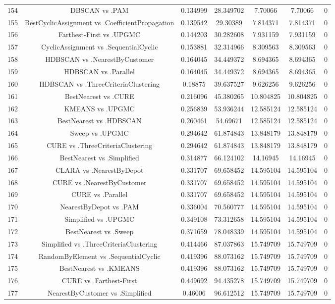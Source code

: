\documentclass[a4paper,10pt]{article}
\begin{document}
\begin{landscape}
\begin{table}[!htp]
\begin{tabular}{ccccccc}
154&DBSCAN vs .PAM&0.134999&28.349702&7.70066&7.70066&0\\
155&BestCyclicAssignment vs .CoefficientPropagation&0.139542&29.30389&7.814371&7.814371&0\\
156&Farthest-First vs .UPGMC&0.144203&30.282608&7.931159&7.931159&0\\
157&CyclicAssignment vs .SequentialCyclic&0.153881&32.314966&8.309563&8.309563&0\\
158&HDBSCAN vs .NearestByCustomer&0.164045&34.449372&8.694365&8.694365&0\\
159&HDBSCAN vs .Parallel&0.164045&34.449372&8.694365&8.694365&0\\
160&HDBSCAN vs .ThreeCriteriaClustering&0.18875&39.637527&9.626256&9.626256&0\\
161&BestNearest vs .CURE&0.216096&45.380265&10.804825&10.804825&0\\
162&KMEANS vs .UPGMC&0.256839&53.936244&12.585124&12.585124&0\\
163&BestNearest vs .HDBSCAN&0.260461&54.69671&12.585124&12.585124&0\\
164&Sweep vs .UPGMC&0.294642&61.874843&13.848179&13.848179&0\\
165&CURE vs .ThreeCriteriaClustering&0.294642&61.874843&13.848179&13.848179&0\\
166&BestNearest vs .Simplified&0.314877&66.124102&14.16945&14.16945&0\\
167&CLARA vs .NearestByDepot&0.331707&69.658452&14.595104&14.595104&0\\
168&CURE vs .NearestByCustomer&0.331707&69.658452&14.595104&14.595104&0\\
169&CURE vs .Parallel&0.331707&69.658452&14.595104&14.595104&0\\
170&NearestByDepot vs .PAM&0.336004&70.560777&14.595104&14.595104&0\\
171&Simplified vs .UPGMC&0.349108&73.312658&14.595104&14.595104&0\\
172&BestNearest vs .Sweep&0.371659&78.048339&14.595104&14.595104&0\\
173&Simplified vs .ThreeCriteriaClustering&0.414466&87.037863&15.749709&15.749709&0\\
174&RandomByElement vs .SequentialCyclic&0.419396&88.073162&15.749709&15.749709&0\\
175&BestNearest vs .KMEANS&0.419396&88.073162&15.749709&15.749709&0\\
176&CURE vs .Farthest-First&0.449692&94.435278&15.749709&15.749709&0\\
177&NearestByCustomer vs .Simplified&0.46006&96.612512&15.749709&15.749709&0\\

\end{tabular}
\end{table}
\end{landscape}
\end{document}
